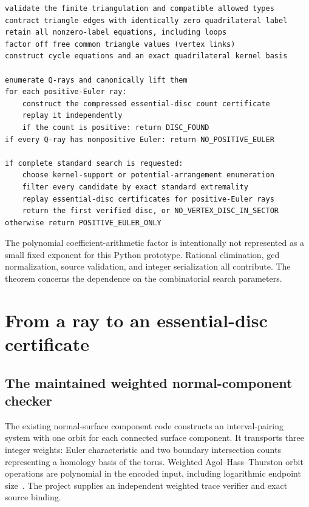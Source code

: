 \documentclass[11pt]{article}
\theoremstyle{definition}
\theoremstyle{remark}
\begin{document}
\begin{lstlisting}[caption={Fixed-sector discovery; all arithmetic is exact.}]
validate the finite triangulation and compatible allowed types
contract triangle edges with identically zero quadrilateral label
retain all nonzero-label equations, including loops
factor off free common triangle values (vertex links)
construct cycle equations and an exact quadrilateral kernel basis

enumerate Q-rays and canonically lift them
for each positive-Euler ray:
    construct the compressed essential-disc count certificate
    replay it independently
    if the count is positive: return DISC_FOUND
if every Q-ray has nonpositive Euler: return NO_POSITIVE_EULER

if complete standard search is requested:
    choose kernel-support or potential-arrangement enumeration
    filter every candidate by exact standard extremality
    replay essential-disc certificates for positive-Euler rays
    return the first verified disc, or NO_VERTEX_DISC_IN_SECTOR
otherwise return POSITIVE_EULER_ONLY
\end{lstlisting}

The polynomial coefficient-arithmetic factor is intentionally not represented
as a small fixed exponent for this Python prototype. Rational elimination,
gcd normalization, source validation, and integer serialization all contribute.
The theorem concerns the dependence on the combinatorial search parameters.

\section{From a ray to an essential-disc certificate}
\label{sec:certificates}

\subsection{The maintained weighted normal-component checker}

The existing normal-surface component code constructs an interval-pairing
system with one orbit for each connected surface component. It transports
three integer weights: Euler characteristic and two boundary intersection
counts representing a homology basis of the torus. Weighted
Agol--Hass--Thurston orbit operations are polynomial in the encoded input,
including logarithmic endpoint size~\cite[Theorems 12 and 16, Corollary 17]{aht}.
The project supplies an independent weighted trace verifier and exact
source binding.
\end{document}
